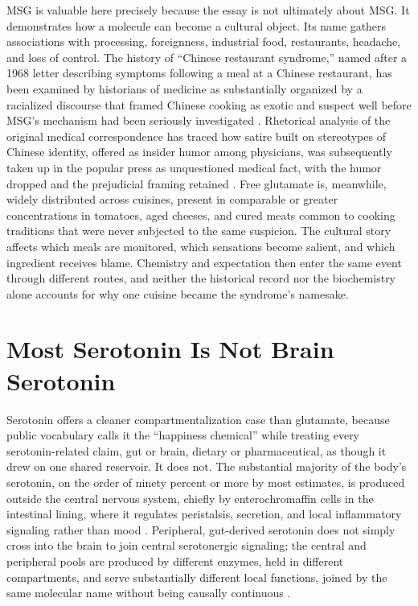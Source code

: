 \documentclass[11pt]{article}
\begin{document}
MSG is valuable here precisely because the essay is not ultimately about MSG. It demonstrates how a molecule can become a cultural object. Its name gathers associations with processing, foreignness, industrial food, restaurants, headache, and loss of control. The history of ``Chinese restaurant syndrome,'' named after a 1968 letter describing symptoms following a meal at a Chinese restaurant, has been examined by historians of medicine as substantially organized by a racialized discourse that framed Chinese cooking as exotic and suspect well before MSG's mechanism had been seriously investigated \citep{mosby2009wonton}. Rhetorical analysis of the original medical correspondence has traced how satire built on stereotypes of Chinese identity, offered as insider humor among physicians, was subsequently taken up in the popular press as unquestioned medical fact, with the humor dropped and the prejudicial framing retained \citep{lemesurier2017uptaking}. Free glutamate is, meanwhile, widely distributed across cuisines, present in comparable or greater concentrations in tomatoes, aged cheeses, and cured meats common to cooking traditions that were never subjected to the same suspicion. The cultural story affects which meals are monitored, which sensations become salient, and which ingredient receives blame. Chemistry and expectation then enter the same event through different routes, and neither the historical record nor the biochemistry alone accounts for why one cuisine became the syndrome's namesake.

\section{Most Serotonin Is Not Brain Serotonin}

Serotonin offers a cleaner compartmentalization case than glutamate, because public vocabulary calls it the ``happiness chemical'' while treating every serotonin-related claim, gut or brain, dietary or pharmaceutical, as though it drew on one shared reservoir. It does not. The substantial majority of the body's serotonin, on the order of ninety percent or more by most estimates, is produced outside the central nervous system, chiefly by enterochromaffin cells in the intestinal lining, where it regulates peristalsis, secretion, and local inflammatory signaling rather than mood \citep{gershon2013serotonin}. Peripheral, gut-derived serotonin does not simply cross into the brain to join central serotonergic signaling; the central and peripheral pools are produced by different enzymes, held in different compartments, and serve substantially different local functions, joined by the same molecular name without being causally continuous \citep{gershon2013serotonin}.
\end{document}
